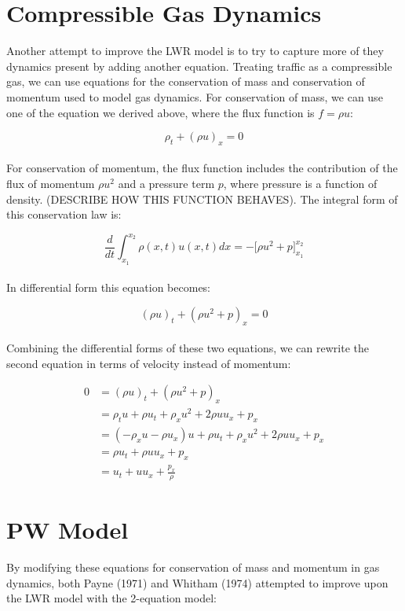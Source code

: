\documentclass{article}
\begin{document}
\section{Compressible Gas Dynamics}

Another attempt to improve the LWR model is to try to capture more of they dynamics present by adding another equation.  Treating traffic as a compressible gas, we can use equations for the conservation of mass and conservation of momentum used to model gas dynamics.  For conservation of mass, we can use one of the equation we derived above, where the flux function is $f = \rho u$:

\[ \rho_t + (\rho u)_x = 0 \] \\

For conservation of momentum, the flux function includes the contribution of the flux of momentum $\rho u^2$ and a pressure term $p$, where pressure is a function of density.  (DESCRIBE HOW THIS FUNCTION BEHAVES).  The integral form of this conservation law is:

\[ \frac{d}{dt} \int_{x_1}^{x_2} \rho(x,t) u(x,t) dx = -\Big[ \rho u^2 + p \Big]_{x_1}^{x_2} \] \\

In differential form this equation becomes: 

\[ (\rho u)_t + (\rho u^2 + p)_x = 0 \] \\

Combining the differential forms of these two equations, we can rewrite the second equation in terms of velocity instead of momentum: 

\begin{align*}
0 &= (\rho u)_t + (\rho u^2 + p)_x \\[1ex]
&= \rho_t u + \rho u_t + \rho_x u^2 + 2 \rho u u_x + p_x \\[1ex]
&= \left( -\rho_x u - \rho u_x \right) u + \rho u_t + \rho_x u^2 + 2 \rho u u_x + p_x \\[1ex]
&= \rho u_t + \rho u u_x + p_x \\[1ex]
&= u_t + u u_x + \frac{p_x}{\rho} 
\end{align*}

\section{PW Model}

By modifying these equations for conservation of mass and momentum in gas dynamics, both Payne (1971) and Whitham (1974) attempted to improve upon the LWR model with the 2-equation model: 
\end{document}
